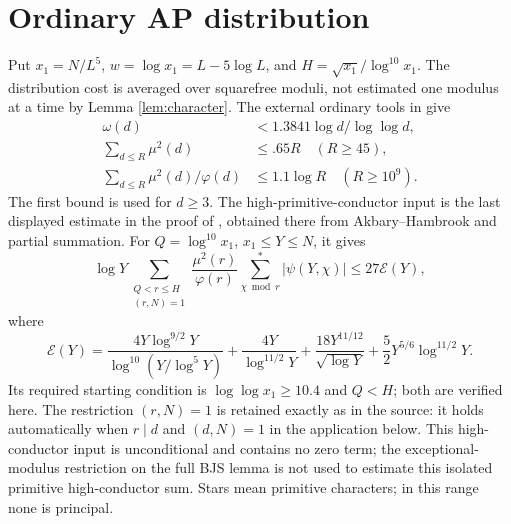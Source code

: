 \documentclass[11pt]{article}
\theoremstyle{remark}\newtheorem{remark}[theorem]{Remark}
\begin{document}
\section{Ordinary AP distribution}\label{sec:AP}
Put $x_1=N/L^5$, $w=\log x_1=L-5\log L$, and
$H=\sqrt{x_1}/\log^{10}x_1$.
The distribution cost is averaged over squarefree moduli, not estimated
one modulus at a time by Lemma \ref{lem:character}.
The external ordinary tools in \cite[Lemmas 22--24]{BJS} give
\begin{align*}
\omega(d)&<1.3841\log d/\log\log d,\\
\sum_{d\le R}\mu^2(d)&\le.65R\quad(R\ge45),\\
\sum_{d\le R}\mu^2(d)/\varphi(d)&\le1.1\log R\quad(R\ge10^9).
\end{align*}
The first bound is used for $d\ge3$.
The high-primitive-conductor input is the last displayed estimate in
the proof of \cite[Lemma 30, source label \texttt{small313}]{BJS},
obtained there from Akbary--Hambrook \cite[Theorem 1.2]{AH} and partial
summation. For $Q=\log^{10}x_1$, $x_1\le Y\le N$, it gives
\begin{equation}\label{eq:AHinput}
\log Y\sum_{\substack{Q<r\le H\\(r,N)=1}}\frac{\mu^2(r)}{\varphi(r)}
\sum_{\chi\bmod r}^{*}|\psi(Y,\chi)|\le27\mathcal E(Y),
\end{equation}
where
\[
\mathcal E(Y)=\frac{4Y\log^{9/2}Y}{\log^{10}(Y/\log^5Y)}
+\frac{4Y}{\log^{11/2}Y}
+\frac{18Y^{11/12}}{\sqrt{\log Y}}
+\frac52Y^{5/6}\log^{11/2}Y.
\]
Its required starting condition is $\log\log x_1\ge10.4$ and
$Q<H$; both are verified here. The restriction $(r,N)=1$ is retained
exactly as in the source: it holds automatically when $r\mid d$ and
$(d,N)=1$ in the application below. This high-conductor input is
unconditional and contains no zero term; the exceptional-modulus
restriction on the full BJS lemma is not used to estimate this isolated
primitive high-conductor sum. Stars mean primitive characters; in this
range none is principal.
\end{document}
